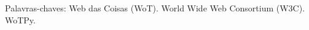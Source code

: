 \begin{resumo}
Palavras-chaves: Web das Coisas (WoT). World Wide Web Consortium (W3C). WoTPy.
\end{resumo}

